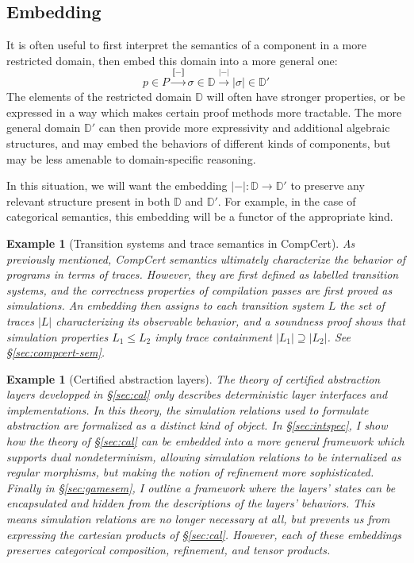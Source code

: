 \documentclass[draft,11pt]{report}
\newtheorem{example}[theorem]{Example}
\theoremstyle{definition}
\begin{document}

\subsection{Embedding} %

It is often useful to first interpret the semantics of a component
in a more restricted domain,
then embed this domain into a more general one:
\[
    p \in P \xrightarrow{\llbracket - \rrbracket}
    \sigma \in \mathbb{D} \xrightarrow{|-|}
    |\sigma| \in \mathbb{D}'
\]
The elements of the restricted domain $\mathbb{D}$
will often have stronger properties,
or be expressed in a way which makes certain
proof methods more tractable.
The more general domain $\mathbb{D}'$
can then provide more expressivity
and additional algebraic structures,
and may embed the behaviors of different kinds of components,
but may be less amenable to domain-specific reasoning.

In this situation,
we will want the embedding
$|-| : \mathbb{D} \rightarrow \mathbb{D}'$
to preserve any relevant structure present in both
$\mathbb{D}$ and $\mathbb{D}'$.
For example,
in the case of categorical semantics,
this embedding will be a functor
of the appropriate kind.

\begin{example}[Transition systems and trace semantics in CompCert] %
As previously mentioned,
CompCert semantics
ultimately characterize the behavior of programs
in terms of traces.
However,
they are first defined as labelled transition systems,
and the correctness properties of compilation passes
are first proved as simulations.
An embedding then assigns to each transition system $L$
the set of traces $|L|$ characterizing
its observable behavior,
and a soundness proof shows that
simulation properties $L_1 \le L_2$
imply trace containment $|L_1| \supseteq |L_2|$.
See \S\ref{sec:compcert-sem}.
\end{example}

\begin{example}[Certified abstraction layers] %
The theory of certified abstraction layers
developped in \S\ref{sec:cal}
only describes deterministic layer interfaces
and implementations.
In this theory,
the simulation relations used to formulate abstraction
are formalized as a distinct kind of object.
In \S\ref{sec:intspec},
I show how the theory of \S\ref{sec:cal}
can be embedded into a more general framework
which supports dual nondeterminism,
allowing simulation relations
to be internalized as regular morphisms,
but making the notion of refinement more sophisticated.
Finally in \S\ref{sec:gamesem},
I outline a framework where the layers' states
can be encapsulated and hidden from
the descriptions of the layers' behaviors.
This means simulation relations are no longer necessary at all,
but prevents us from expressing the cartesian products of \S\ref{sec:cal}.
However,
each of these embeddings preserves categorical composition,
refinement, and tensor products.
\end{example}
\end{document}
